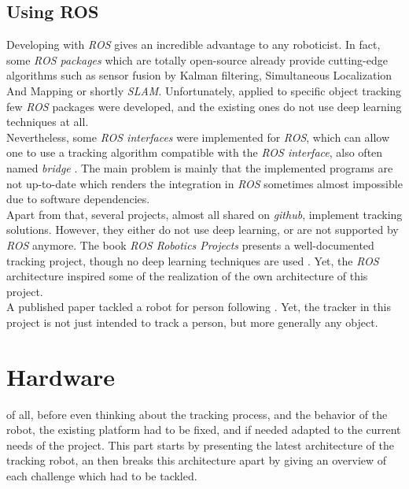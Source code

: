 		
		\section{Using ROS}
		
		Developing with \textit{ROS} gives an incredible
		advantage to any roboticist. In fact, some \textit{ROS packages}
		which are totally open-source already provide cutting-edge algorithms
		such as sensor fusion by Kalman filtering, Simultaneous Localization And Mapping or shortly \textit{SLAM}.
		Unfortunately, 
		applied to specific object tracking few \textit{ROS} packages were developed, and
		the existing ones do not use deep learning techniques at all.
		\\\indent Nevertheless, some \textit{ROS interfaces} were implemented
		for \textit{ROS}, which can allow one to use a tracking algorithm
		compatible with the \textit{ROS interface}, also often named
		\textit{bridge} \cite{mtf}. The main problem is mainly that the implemented
		programs are not up-to-date which renders the integration
		in \textit{ROS} sometimes almost impossible due to software dependencies.
		\\\indent Apart from that, several projects, almost all shared on
		\textit{github}, implement tracking solutions. However, they 
		either do not use deep learning, or are not supported by \textit{ROS} 
		anymore. The book \textit{ROS Robotics Projects} presents
		a well-documented tracking project, though no
		deep learning techniques are used \cite{rosprojects}. Yet, 
		the \textit{ROS} architecture inspired some of the realization 
		of the own architecture of this project.
		\\\indent A published paper tackled a robot for person following \cite{personfollowing}.
		Yet, the tracker in this project is not just intended to track a person, 
		but more generally any object.

\chapter{Hardware}\label{hardware}

 of all, before even thinking about the tracking process, and
the behavior of the robot, the existing platform had to be fixed, and if needed adapted
to the current needs of the project. This part starts by presenting the latest architecture 
of the tracking robot, an then breaks this architecture apart by giving an overview of
each challenge which had to be tackled.
	
